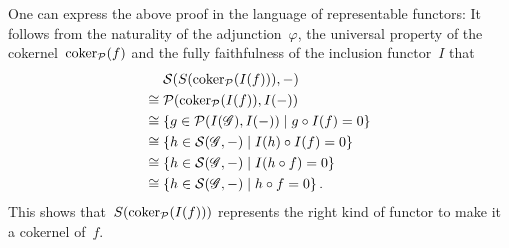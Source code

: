 \begin{example}
\begin{enumerate}
      \begin{remark*}
        One can express the above proof in the language of representable functors:
        It follows from the naturality of the adjunction~$\varphi$, the universal property of the cokernel~$\operatorname{coker}_{\mathcal{P}}(f)$ and the fully faithfulness of the inclusion functor~$I$ that
        \begin{align*}
               {}&  \Scat(S(\coker_{\Pcat}(I(f))), -) \\
          \cong{}&  \Pcat(\coker_{\Pcat}(I(f)), I(-)) \\
          \cong{}&  \{
                      g \in \Pcat(I(\Gs), I(-))
                    \suchthat
                      g \circ I(f) = 0
                    \}  \\
          \cong{}&  \{
                      h \in \Scat(\Gs,-)
                    \suchthat
                      I(h) \circ I(f) = 0
                    \}  \\
          \cong{}&  \{
                      h \in \Scat(\Gs,-)
                    \suchthat
                      I(h \circ f) = 0
                    \}  \\
          \cong{}&  \{
                      h \in \Scat(\Gs,-)
                    \suchthat
                      h \circ f = 0
                    \} \,.
        \end{align*}
        This shows that~$S(\operatorname{coker}_{\mathcal{P}}(I(f)))$ represents the right kind of functor to make it a cokernel of~$f$.
      \end{remark*}
  \end{enumerate}
  
  
  
  
  
  
  
  
  
  

\end{example}
